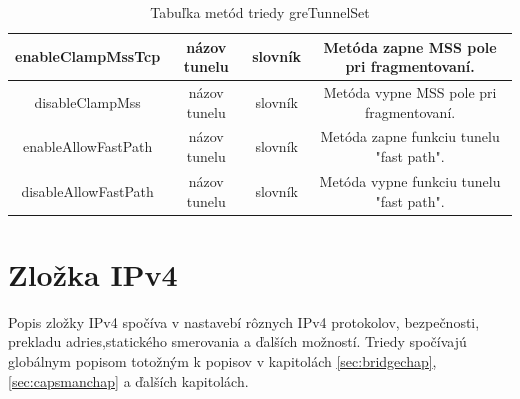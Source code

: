 \begin{table}[H]
{\begin{tabular}{|c|c|c|c|}
enableClampMssTcp & názov tunelu & slovník & Metóda zapne MSS pole pri fragmentovaní. \\ \hline
disableClampMss & názov tunelu & slovník & Metóda vypne MSS pole pri fragmentovaní. \\ \hline
enableAllowFastPath & názov tunelu & slovník & Metóda zapne funkciu tunelu "fast path". \\ \hline
disableAllowFastPath & názov tunelu & slovník & Metóda vypne funkciu tunelu "fast path". \\ \hline
\end{tabular}%
}
\caption{Tabuľka metód triedy greTunnelSet}
\label{tab:greTunel}
\end{table}
\section{Zložka IPv4}
Popis  zložky IPv4 spočíva v nastavebí rôznych IPv4 protokolov, bezpečnosti, prekladu adries,statického smerovania a ďalších možností. Triedy spočívajú globálnym popisom totožným k popisov v kapitolách \ref{sec:bridgechap}, \ref{sec:capsmanchap} a ďalších kapitolách.  
